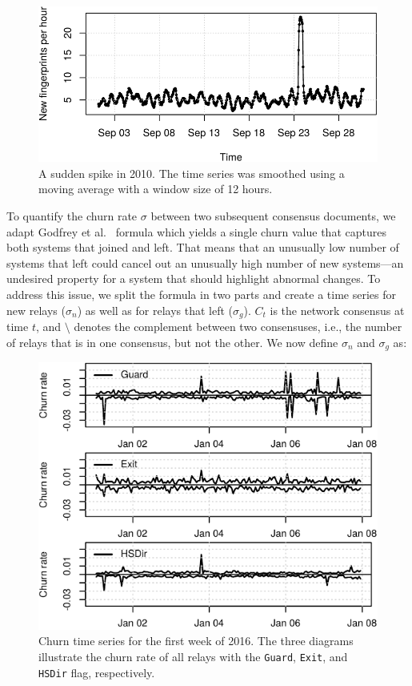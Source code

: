\begin{figure}[t]
	\centering
	\includegraphics[width=\linewidth]{diagrams/sudden-spike.pdf}
	\caption{A sudden spike in 2010.  The time series was smoothed using a
	moving average with a window size of 12 hours.}
	\label{fig:sudden-spike}
\end{figure}

To quantify the churn rate $\sigma$ between two subsequent consensus documents,
we adapt Godfrey et al.~\cite{Godfrey2006a} formula which yields a single churn
value that captures both systems that joined and left.  That means that an
unusually low number of systems that left could cancel out an unusually high
number of new systems---an undesired property for a system that should highlight
abnormal changes.  To address this issue, we split the formula in two parts and
create a time series for new relays ($\sigma_{n}$) as well as for relays that
left ($\sigma_{g}$).  $C_{t}$ is the network consensus at time $t$, and
$\setminus$ denotes the complement between two consensuses, i.e., the number of
relays that is in one consensus, but not the other.  We now define $\sigma_{n}$
and $\sigma_{g}$ as:

\begin{figure}[t]
	\centering
	\includegraphics[width=\linewidth]{diagrams/churn-example.pdf}
	\caption{Churn time series for the first week of 2016.  The three diagrams
		illustrate the churn rate of all relays with the \texttt{Guard},
		\texttt{Exit}, and \texttt{HSDir} flag, respectively.}
	\label{fig:churn-example}
\end{figure}


